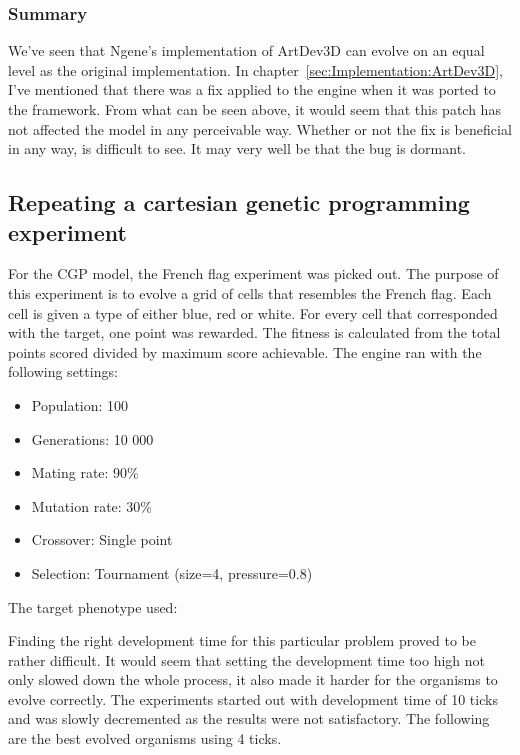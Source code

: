 \subsubsection{Summary}
We've seen that Ngene's implementation of ArtDev3D can evolve on an equal level as the original implementation. In chapter~\ref{sec:Implementation:ArtDev3D}, I've mentioned that there was a fix applied to the engine when it was ported to the framework. From what can be seen above, it would seem that this patch has not affected the model in any perceivable way. Whether or not the fix is beneficial in any way, is difficult to see. It may very well be that the bug is dormant.


\subsection{Repeating a cartesian genetic programming experiment}
For the CGP model, the French flag experiment was picked out. The purpose of this experiment is to evolve a grid of cells that resembles the French flag. Each cell is given a type of either blue, red or white. For every cell that corresponded with the target, one point was rewarded. The fitness is calculated from the total points scored divided by maximum score achievable. The engine ran with the following settings:

\begin{itemize}
	\itemsep=-2pt
	\item Population: 100
	\item Generations: 10 000
	\item Mating rate: 90\%
	\item Mutation rate: 30\%
	\item Crossover: Single point
	\item Selection: Tournament (size=4, pressure=0.8)
\end{itemize}

The target phenotype used:

\begin{center}\end{center}

Finding the right development time for this particular problem proved to be rather difficult. It would seem that setting the development time too high not only slowed down the whole process, it also made it harder for the organisms to evolve correctly. The experiments started out with development time of 10 ticks and was slowly decremented as the results were not satisfactory. The following are the best evolved organisms using 4 ticks.

